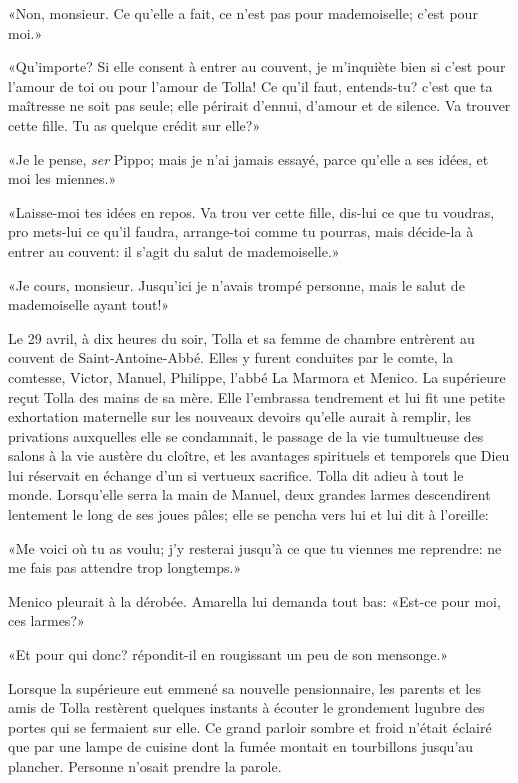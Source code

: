 «Non, monsieur. Ce qu'elle a fait, ce n'est pas pour mademoiselle; c'est pour moi.»

«Qu'importe? Si elle consent à entrer au couvent, je m'inquiète bien si c'est pour l'amour de toi ou pour l'amour de Tolla! Ce qu'il faut, entends-tu? c'est que ta maîtresse ne soit pas seule; elle périrait d'ennui, d'amour et de silence. Va trouver cette fille. Tu as quelque crédit sur elle?»

«Je le pense, \emph{ser} Pippo; mais je n'ai jamais essayé, parce qu'elle a ses idées, et moi les miennes.»

«Laisse-moi tes idées en repos. Va trou ver cette fille, dis-lui ce que tu voudras, pro mets-lui ce qu'il faudra, arrange-toi comme tu pourras, mais décide-la à entrer au couvent: il s'agit du salut de mademoiselle.»

«Je cours, monsieur. Jusqu'ici je n'avais trompé personne, mais le salut de mademoiselle ayant tout!»

Le 29 avril, à dix heures du soir, Tolla et sa femme de chambre entrèrent au couvent de Saint-Antoine-Abbé. Elles y furent conduites par le comte, la comtesse, Victor, Manuel, Philippe, l'abbé La Marmora et Menico. La supérieure reçut Tolla des mains de sa mère. Elle l'embrassa tendrement et lui fit une petite exhortation maternelle sur les nouveaux devoirs qu'elle aurait à remplir, les privations auxquelles elle se condamnait, le passage de la vie tumultueuse des salons à la vie austère du cloître, et les avantages spirituels et temporels que Dieu lui réservait en échange d'un si vertueux sacrifice. Tolla dit adieu à tout le monde. Lorsqu'elle serra la main de Manuel, deux grandes larmes descendirent lentement le long de ses joues pâles; elle se pencha vers lui et lui dit à l'oreille:

«Me voici où tu as voulu; j'y resterai jusqu'à ce que tu viennes me reprendre: ne me fais pas attendre trop longtemps.»

Menico pleurait à la dérobée. Amarella lui demanda tout bas: «Est-ce pour moi, ces larmes?»

«Et pour qui donc? répondit-il en rougissant un peu de son mensonge.»

Lorsque la supérieure eut emmené sa nouvelle pensionnaire, les parents et les amis de Tolla restèrent quelques instants à écouter le grondement lugubre des portes qui se fermaient sur elle. Ce grand parloir sombre et froid n'était éclairé que par une lampe de cuisine dont la fumée montait en tourbillons jusqu'au plancher. Personne n'osait prendre la parole.

